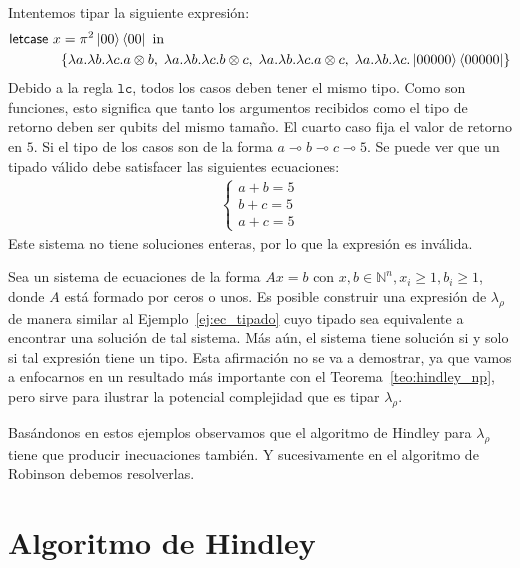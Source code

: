 \begin{ejemplo}\label{ej:ec_tipado}
    Intentemos tipar la siguiente expresión:
    \begin{align*}
        \textsf{letcase }x &= \pi^2 \ket{00}\bra{00} \textrm{ in } \\
        &\{\lambda a.\lambda b.\lambda c.a\otimes b,\;\lambda a.\lambda b.\lambda c.b\otimes c,\;\lambda a.\lambda b.\lambda c.a\otimes c, \;\lambda a.\lambda b.\lambda c.\ket{00000}\bra{00000}\}
    \end{align*}
     Debido a la regla $\mathtt{lc}$, todos los casos deben tener el mismo tipo. Como son funciones, esto significa que tanto los argumentos recibidos como el tipo de retorno deben ser qubits del mismo tamaño. El cuarto caso fija el valor de retorno en $5$. Si el tipo de los casos son de la forma $a\multimap b \multimap c \multimap 5$. Se puede ver que un tipado válido debe satisfacer las siguientes ecuaciones:
    \begin{align*}
        \begin{cases}
            a+b=5\\
            b+c=5\\
            a+c=5
        \end{cases}
    \end{align*}
    Este sistema no tiene soluciones enteras, por lo que la expresión es inválida.
\end{ejemplo}
\begin{observacion}
    Sea un sistema de ecuaciones de la forma $Ax=b$ con $x,b\in \mathbb{N}^n, x_i\geq 1, b_i\geq 1$, donde $A$ está formado por ceros o unos. Es posible construir una expresión de $\lambda_\rho$ de manera similar al Ejemplo~\ref{ej:ec_tipado} cuyo tipado sea equivalente a encontrar una solución de tal sistema. Más aún, el sistema tiene solución si y solo si tal expresión tiene un tipo. Esta afirmación no se va a demostrar, ya que vamos a enfocarnos en un resultado más importante con el Teorema~\ref{teo:hindley_np}, pero sirve para ilustrar la potencial complejidad que es tipar $\lambda_\rho$.
\end{observacion}

Basándonos en estos ejemplos observamos que el algoritmo de Hindley para $\lambda_\rho$ tiene que producir inecuaciones también. Y sucesivamente en el algoritmo de Robinson debemos resolverlas.

\section{Algoritmo de Hindley}

